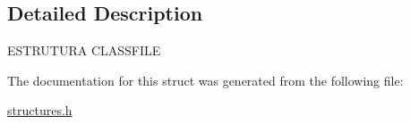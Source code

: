 \subsection{Detailed Description}


 E\+S\+T\+R\+U\+T\+U\+RA C\+L\+A\+S\+S\+F\+I\+LE 

The documentation for this struct was generated from the following file\+:\begin{DoxyCompactItemize}
\item 
\mbox{\hyperlink{structures_8h}{structures.\+h}}\end{DoxyCompactItemize}
